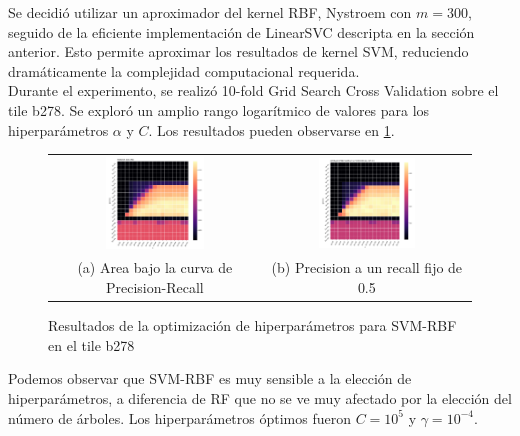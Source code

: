 Se decidió utilizar un aproximador del kernel RBF, Nystroem con $m=300$, seguido de la eficiente implementación de LinearSVC descripta en la sección anterior. Esto permite aproximar los resultados de kernel SVM, reduciendo dramáticamente la complejidad computacional requerida.\\

Durante el experimento, se realizó 10-fold Grid Search Cross Validation sobre el tile b278. Se exploró un amplio rango logarítmico de valores para los hiperparámetros $\alpha$ y $C$. Los resultados pueden observarse en \ref{fig:optimisationsvmk}. \\

\begin{figure}[h!]
\begin{tabular}{cc}
  \includegraphics[width=0.49\textwidth]{Kap3/Figure_2.png} &   \includegraphics[width=0.49\textwidth]{Kap3/Figure_3.png} \\
(a) Area bajo la curva de Precision-Recall & (b) Precision a un recall fijo de 0.5 
\end{tabular}
\caption{Resultados de la optimización de hiperparámetros para SVM-RBF en el tile b278}
\label{fig:optimisationsvmk}
\end{figure}


Podemos observar que SVM-RBF es muy sensible a la elección de hiperparámetros, a diferencia de RF que no se ve muy afectado por la elección del número de árboles. Los hiperparámetros óptimos fueron $C=10^5$ y $\gamma=10^{-4}$.

